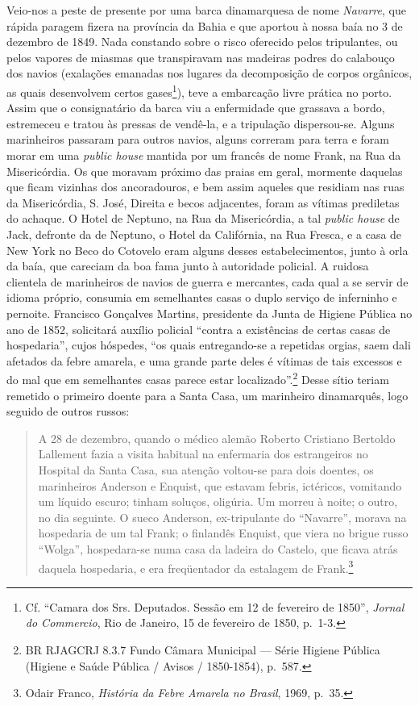Veio-nos a peste de presente por uma barca dinamarquesa de nome
\textit{Navarre}, que rápida paragem fizera na província da Bahia e que
aportou à nossa baía no 3 de dezembro de 1849. Nada constando sobre o
risco oferecido pelos tripulantes, ou pelos vapores de miasmas que
transpiravam nas madeiras podres do calabouço dos navios (exalações
emanadas nos lugares da decomposição de corpos orgânicos, as quais
desenvolvem certos gases\footnote{Cf. ``Camara dos Srs. Deputados.
  Sessão em 12 de fevereiro de 1850'', \textit{Jornal do Commercio}, Rio
  de Janeiro, 15 de fevereiro de 1850, p.~1-3.}), teve a embarcação
livre prática no porto. Assim que o consignatário da barca viu a
enfermidade que grassava a bordo, estremeceu e tratou às pressas de
vendê-la, e a tripulação dispersou-se. Alguns marinheiros passaram para
outros navios, alguns correram para terra e foram morar em uma
\textit{public house} mantida por um francês de nome Frank, na Rua da
Misericórdia. Os que moravam próximo das praias em geral, mormente
daquelas que ficam vizinhas dos ancoradouros, e bem assim aqueles que
residiam nas ruas da Misericórdia, S. José, Direita e becos adjacentes,
foram as vítimas prediletas do achaque. O Hotel de Neptuno, na Rua da
Misericórdia, a tal \textit{public house} de Jack, defronte da de Neptuno,
o Hotel da Califórnia, na Rua Fresca, e a casa de New York no Beco do
Cotovelo eram alguns desses estabelecimentos, junto à orla da baía, que
careciam da boa fama junto à autoridade policial. A ruidosa clientela de
marinheiros de navios de guerra e mercantes, cada qual a se servir de
idioma próprio, consumia em semelhantes casas o duplo serviço de
inferninho e pernoite. Francisco Gonçalves Martins, presidente da Junta
de Higiene Pública no ano de 1852, solicitará auxílio policial ``contra
a existências de certas casas de hospedaria'', cujos hóspedes, ``os
quais entregando-se a repetidas orgias, saem dali afetados da febre
amarela, e uma grande parte deles é vítimas de tais excessos e do mal
que em semelhantes casas parece estar localizado''.\footnote{BR RJAGCRJ
  8.3.7 Fundo Câmara Municipal --- Série Higiene Pública (Higiene e Saúde
  Pública / Avisos / 1850-1854), p.~587.} Desse sítio teriam remetido o
primeiro doente para a Santa Casa, um marinheiro dinamarquês, logo
seguido de outros russos:

\begin{quote}
A 28 de dezembro, quando o médico alemão Roberto Cristiano Bertoldo
Lallement fazia a visita habitual na enfermaria dos estrangeiros no
Hospital da Santa Casa, sua atenção voltou-se para dois doentes, os
marinheiros Anderson e Enquist, que estavam febris, ictéricos, vomitando
um líquido escuro; tinham soluços, oligúria. Um morreu à noite; o outro,
no dia seguinte. O sueco Anderson, ex-tripulante do ``Navarre'', morava
na hospedaria de um tal Frank; o finlandês Enquist, que viera no brigue
russo ``Wolga'', hospedara-se numa casa da ladeira do Castelo, que
ficava atrás daquela hospedaria, e era freqüentador da estalagem de
Frank.\footnote{Odair Franco, \textit{História da Febre Amarela no
  Brasil}, 1969, p.~35.}
\end{quote}

